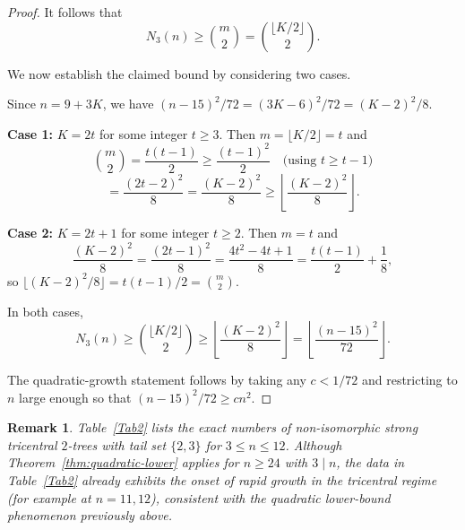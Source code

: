 \documentclass[12pt]{article}
\newtheorem{remark}[theorem]{Remark}
\numberwithin{equation}{section}
\begin{document}
\begin{proof}
It follows that
\[
N_3(n)\ge\binom{m}{2}=\binom{\lfloor K/2\rfloor}{2}.
\]

We now establish the claimed bound by considering two cases.

Since $n=9+3K$, we have $(n-15)^2/72=(3K-6)^2/72=(K-2)^2/8$.

\textbf{Case 1:} $K=2t$ for some integer $t\ge 3$.
Then $m=\lfloor K/2\rfloor=t$ and
\[
\binom{m}{2}=\frac{t(t-1)}{2}\ge \frac{(t-1)^2}{2}
\quad\text{(using $t\ge t-1$)}
\]
\[
=\frac{(2t-2)^2}{8}=\frac{(K-2)^2}{8}
\ge \left\lfloor \frac{(K-2)^2}{8}\right\rfloor.
\]

\textbf{Case 2:} $K=2t+1$ for some integer $t\ge 2$.
Then $m=t$ and
\[
\frac{(K-2)^2}{8}=\frac{(2t-1)^2}{8}=\frac{4t^2-4t+1}{8}=\frac{t(t-1)}{2}+\frac{1}{8},
\]
so $\lfloor (K-2)^2/8\rfloor=t(t-1)/2=\binom{m}{2}$.

In both cases,
\[
N_3(n)\ge\binom{\lfloor K/2\rfloor}{2}\ge\left\lfloor \frac{(K-2)^2}{8}\right\rfloor
=\left\lfloor \frac{(n-15)^2}{72}\right\rfloor.
\]

The quadratic-growth statement follows by taking any $c<1/72$ and restricting to $n$ large enough so that $(n-15)^2/72\ge cn^2$.
\end{proof}
\begin{remark}
Table~\ref{Tab2} lists the exact numbers of non-isomorphic strong tricentral $2$-trees
with tail set $\{2,3\}$ for $3\le n\le 12$.
Although Theorem~\ref{thm:quadratic-lower} applies for $n\ge 24$ with $3\mid n$,
the data in Table~\ref{Tab2} already exhibits the onset of rapid growth in the tricentral
regime (for example at $n=11,12$), consistent with the quadratic lower-bound phenomenon previously above.
\end{remark}
\end{document}
